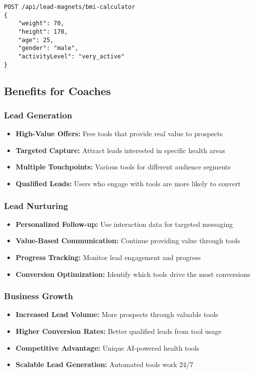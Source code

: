 \documentclass[12pt,a4paper]{article}
\begin{document}
\begin{lstlisting}[caption=Calculate BMI]
POST /api/lead-magnets/bmi-calculator
{
    "weight": 70,
    "height": 170,
    "age": 25,
    "gender": "male",
    "activityLevel": "very_active"
}
\end{lstlisting}

\subsection{Benefits for Coaches}

\subsubsection{Lead Generation}
\begin{itemize}
    \item \textbf{High-Value Offers:} Free tools that provide real value to prospects
    \item \textbf{Targeted Capture:} Attract leads interested in specific health areas
    \item \textbf{Multiple Touchpoints:} Various tools for different audience segments
    \item \textbf{Qualified Leads:} Users who engage with tools are more likely to convert
\end{itemize}

\subsubsection{Lead Nurturing}
\begin{itemize}
    \item \textbf{Personalized Follow-up:} Use interaction data for targeted messaging
    \item \textbf{Value-Based Communication:} Continue providing value through tools
    \item \textbf{Progress Tracking:} Monitor lead engagement and progress
    \item \textbf{Conversion Optimization:} Identify which tools drive the most conversions
\end{itemize}

\subsubsection{Business Growth}
\begin{itemize}
    \item \textbf{Increased Lead Volume:} More prospects through valuable tools
    \item \textbf{Higher Conversion Rates:} Better qualified leads from tool usage
    \item \textbf{Competitive Advantage:} Unique AI-powered health tools
    \item \textbf{Scalable Lead Generation:} Automated tools work 24/7
\end{itemize}
\end{document}
